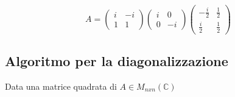 \documentclass[12pt]{article}
\begin{document}
\[A = \begin{pmatrix}
    i & -i\\
    1 & 1
\end{pmatrix}\begin{pmatrix}
    i & 0\\
    0 & -i
\end{pmatrix}\begin{pmatrix}
    -\frac{i}{2} & \frac{1}{2}\\
    \frac{i}{2} & \frac{1}{2}
\end{pmatrix}\]

\subsection{Algoritmo per la diagonalizzazione}

Data una matrice quadrata di $A \in M_{nxn} (\mathbb{{C}})$
\end{document}
